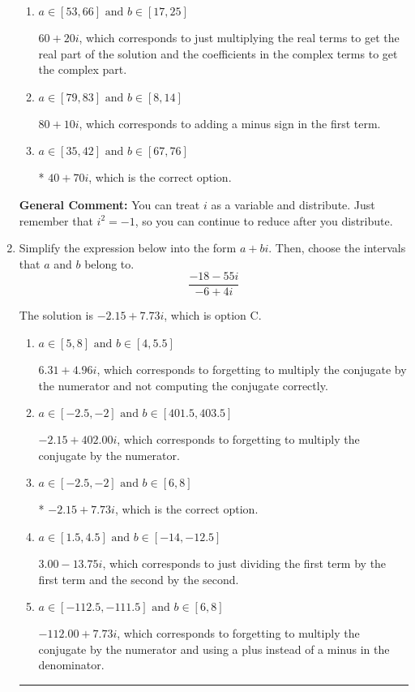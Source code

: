 \documentclass{extbook}[14pt]
\newcommand{\litem}[1]{\item #1

\rule{\textwidth}{0.4pt}}
\begin{document}
\begin{enumerate}
{\begin{enumerate}[label=\Alph*.]
 $40 - 70 i$, which corresponds to adding a minus sign in both terms.
\item \( a \in [53, 66] \text{ and } b \in [17, 25] \)

 $60 + 20 i$, which corresponds to just multiplying the real terms to get the real part of the solution and the coefficients in the complex terms to get the complex part.
\item \( a \in [79, 83] \text{ and } b \in [8, 14] \)

 $80 + 10 i$, which corresponds to adding a minus sign in the first term.
\item \( a \in [35, 42] \text{ and } b \in [67, 76] \)

* $40 + 70 i$, which is the correct option.
\end{enumerate}

\textbf{General Comment:} You can treat $i$ as a variable and distribute. Just remember that $i^2=-1$, so you can continue to reduce after you distribute.
}
\litem{
Simplify the expression below into the form $a+bi$. Then, choose the intervals that $a$ and $b$ belong to.
\[ \frac{-18 - 55 i}{-6 + 4 i} \]

The solution is \( -2.15  + 7.73 i \), which is option C.\begin{enumerate}[label=\Alph*.]
\item \( a \in [5, 8] \text{ and } b \in [4, 5.5] \)

 $6.31  + 4.96 i$, which corresponds to forgetting to multiply the conjugate by the numerator and not computing the conjugate correctly.
\item \( a \in [-2.5, -2] \text{ and } b \in [401.5, 403.5] \)

 $-2.15  + 402.00 i$, which corresponds to forgetting to multiply the conjugate by the numerator.
\item \( a \in [-2.5, -2] \text{ and } b \in [6, 8] \)

* $-2.15  + 7.73 i$, which is the correct option.
\item \( a \in [1.5, 4.5] \text{ and } b \in [-14, -12.5] \)

 $3.00  - 13.75 i$, which corresponds to just dividing the first term by the first term and the second by the second.
\item \( a \in [-112.5, -111.5] \text{ and } b \in [6, 8] \)

 $-112.00  + 7.73 i$, which corresponds to forgetting to multiply the conjugate by the numerator and using a plus instead of a minus in the denominator.
\end{enumerate}

}
\end{enumerate}
\end{document}

